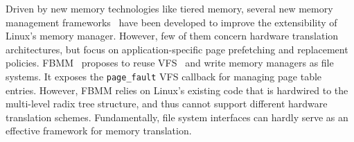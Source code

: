 Driven by new memory technologies like tiered memory, 
	several new memory management frameworks~\cite{Tabatabai2024,Raybuck2021,Jalalian2024}
	have been developed to improve the extensibility of Linux's memory manager.
However, few of them concern hardware translation architectures,
	but focus on application-specific page prefetching and replacement policies.
FBMM~\cite{Tabatabai2024} proposes to 
	reuse VFS~\cite{linux:vfs} and write memory managers as file systems.
It exposes the \texttt{\small page\_fault} VFS callback for managing page table entries.
However, FBMM relies on 
	Linux's existing code that is hardwired 
	to the multi-level radix tree structure,
	and thus cannot support different hardware translation schemes.
Fundamentally, file system interfaces can hardly serve as an effective 
	framework for memory translation.

